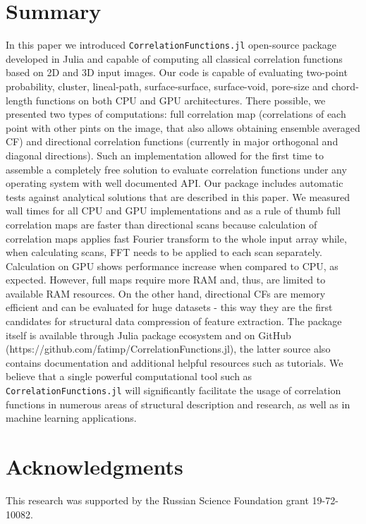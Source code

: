 \documentclass[1p]{elsarticle}
\newcommand{\code}[1]{\colorbox{light-gray}{\texttt{#1}}}
\begin{document}
\section{Summary}
\label{sec:summary}
In this paper we introduced \code{CorrelationFunctions.jl} open-source package
developed in Julia and capable of computing all classical correlation functions
based on 2D and 3D input images. Our code is capable of evaluating two-point
probability, cluster, lineal-path, surface-surface, surface-void, pore-size and
chord-length functions on both CPU and GPU architectures. There possible, we
presented two types of computations: full correlation map (correlations of each
point with other pints on the image, that also allows obtaining ensemble
averaged CF) and directional correlation functions (currently in major
orthogonal and diagonal directions). Such an implementation allowed for the
first time to assemble a completely free solution to evaluate correlation
functions under any operating system with well documented API. Our package
includes automatic tests against analytical solutions that are described in this
paper. We measured wall times for all CPU and GPU implementations and as a rule
of thumb full correlation maps are faster than directional scans because
calculation of correlation maps applies fast Fourier transform to the whole
input array while, when calculating scans, FFT needs to be applied to each scan
separately. Calculation on GPU shows performance increase when compared to CPU,
as expected.  However, full maps require more RAM and, thus, are limited to
available RAM resources. On the other hand, directional CFs are memory efficient
and can be evaluated for huge datasets - this way they are the first candidates
for structural data compression of feature extraction. The package itself is
available through Julia package ecosystem and on GitHub
(https://github.com/fatimp/CorrelationFunctions.jl), the latter source also
contains documentation and additional helpful resources such as tutorials.  We
believe that a single powerful computational tool such as
\code{CorrelationFunctions.jl} will significantly facilitate the usage of
correlation functions in numerous areas of structural description and research,
as well as in machine learning applications.

\section{Acknowledgments}
This research was supported by the Russian Science Foundation grant 19-72-10082.
\end{document}
